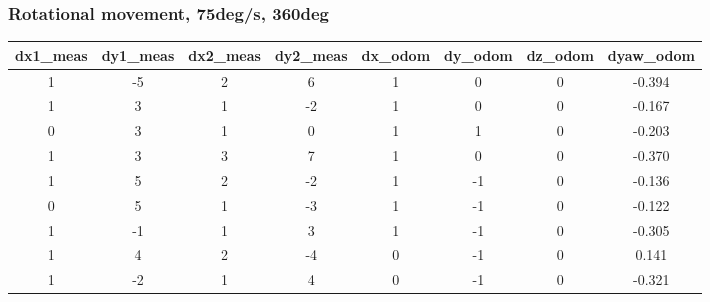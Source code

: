 \documentclass[a4paper, 12pt]{article}
\begin{document}
    \subsubsection{Rotational movement, 75deg/s, 360deg}

    \begin{table}[H]
    \scriptsize
    \begin{tabular}{@{}cccccccc@{}}
    \toprule
    \textbf{dx1\_meas} & \textbf{dy1\_meas} & \textbf{dx2\_meas} & \textbf{dy2\_meas} & \textbf{dx\_odom} & \textbf{dy\_odom} & \textbf{dz\_odom} & \textbf{dyaw\_odom} \\ \midrule
    1                      & -5                     & 2                      & 6                      & 1                 & 0                 & 0                 & -0.394              \\
    1                      & 3                      & 1                      & -2                     & 1                 & 0                 & 0                 & -0.167              \\
    0                      & 3                      & 1                      & 0                      & 1                 & 1                 & 0                 & -0.203              \\
    1                      & 3                      & 3                      & 7                      & 1                 & 0                 & 0                 & -0.370              \\
    1                      & 5                      & 2                      & -2                     & 1                 & -1                & 0                 & -0.136              \\
    0                      & 5                      & 1                      & -3                     & 1                 & -1                & 0                 & -0.122              \\
    1                      & -1                     & 1                      & 3                      & 1                 & -1                & 0                 & -0.305              \\
    1                      & 4                      & 2                      & -4                     & 0                 & -1                & 0                 & 0.141               \\
    1                      & -2                     & 1                      & 4                      & 0                 & -1                & 0                 & -0.321              \\

\end{tabular}
\end{table}
\end{document}
